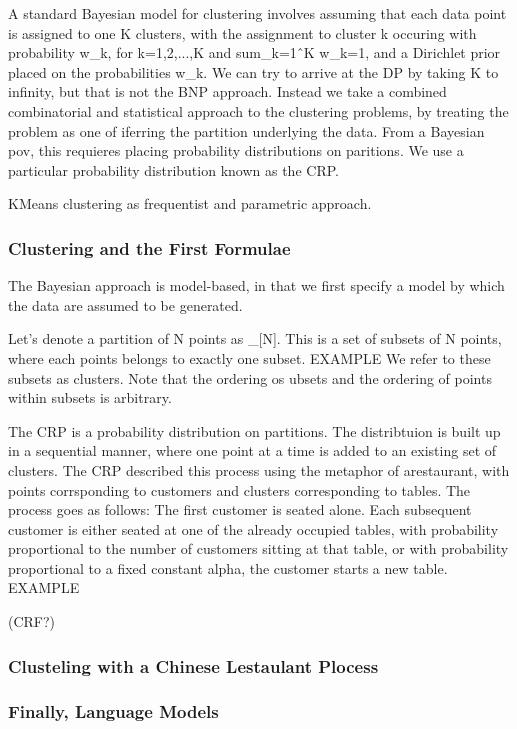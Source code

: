 \documentclass{beamer}
\begin{document}
A standard Bayesian model for clustering involves assuming that each data point is assigned to one K clusters, with the assignment to cluster k occuring with probability w_k, for k=1,2,...,K and sum_k=1ˆK w_k=1, and a Dirichlet prior placed on the probabilities {w_k}. We can try to arrive at the DP by taking K to infinity, but that is not the BNP approach. Instead we take a combined combinatorial and statistical approach to the clustering problems, by treating the problem as one of iferring the partition underlying the data. From a Bayesian pov, this requieres placing probability distributions on paritions. We use a particular probability distribution known as the CRP.

KMeans clustering as frequentist and parametric approach.

\begin{frame}
    \frametitle{Clustering and the First Formulae}
\end{frame}

The Bayesian approach is model-based, in that we first specify a model by which the data are assumed to be generated.

Let's denote a partition of N points as \pi_{[N]}. This is a set of subsets of N points, where each points belongs to exactly one subset. EXAMPLE We refer to these subsets as clusters. Note that the ordering os ubsets and the ordering of points within subsets is arbitrary.

The CRP is a probability distribution on partitions. The distribtuion is built up in a sequential manner, where one point at a time is added to an existing set of clusters. The CRP described this process using the metaphor of  arestaurant, with points corrsponding to customers and clusters corresponding to tables. The process goes as follows: The first customer is seated alone. Each subsequent customer is either seated at one of the already occupied tables, with probability proportional to the number of customers sitting at that table, or with probability proportional to a fixed constant alpha, the customer starts a new table. EXAMPLE

(CRF?)

\begin{frame}
    \frametitle{Clusteling with a Chinese Lestaulant Plocess}
\end{frame}






\begin{frame}
    \frametitle{Finally, Language Models}
\end{frame}
\end{document}
